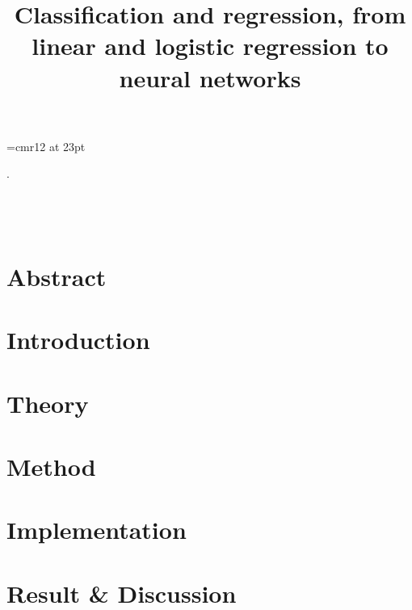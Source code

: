 
\font\myfont=cmr12 at 23pt
\title{\textbf{{\myfont Classification and regression, from linear and logistic regression to neural networks}}}

\mnfrontpage


\pagestyle{fancy}
\fancyhf{}
\fancyfoot[CE,LO]{\leftmark}

\renewcommand{\headrulewidth}{2pt}
\renewcommand{\footrulewidth}{1pt}

\tableofcontents
\color{white}.\color{black}
\\
\\
\\
\\
\section*{Abstract}%


\pagebreak
\section{Introduction}


\pagebreak
\section{Theory}\label{sec:theory}


\label{sec:lalalla}
\label{eq:lalalla}
\label{tab:lalalla}
\label{fig:lalalla}

\pagebreak
\section{Method}



\pagebreak
\section{Implementation}



\pagebreak
\section{Result \& Discussion}




%


